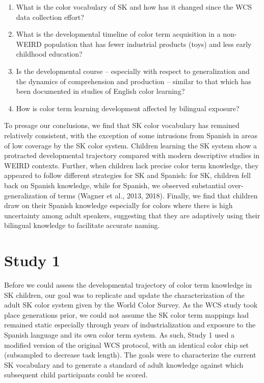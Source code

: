 \documentclass[
  english,
  ,man,floatsintext]{apa6}
\providecommand{\tightlist}{%
  \setlength{\itemsep}{0pt}\setlength{\parskip}{0pt}}
\begin{document}
\begin{enumerate}
\def\labelenumi{\arabic{enumi}.}
\tightlist
\item
  What is the color vocabulary of SK and how has it changed since the WCS data collection effort?
\item
  What is the developmental timeline of color term acquisition in a non-WEIRD population that has fewer industrial products (toys) and less early childhood education?
\item
  Is the developmental course -- especially with respect to generalization and the dynamics of comprehension and production -- similar to that which has been documented in studies of English color learning?
\item
  How is color term learning development affected by bilingual exposure?
\end{enumerate}

To presage our conclusions, we find that SK color vocabulary has remained relatively consistent, with the exception of some intrusions from Spanish in areas of low coverage by the SK color system. Children learning the SK system show a protracted developmental trajectory compared with modern descriptive studies in WEIRD contexts. Further, when children lack precise color term knowledge, they appeared to follow different strategies for SK and Spanish: for SK, children fell back on Spanish knowledge, while for Spanish, we observed substantial over-generalization of terms (Wagner et al., 2013, 2018). Finally, we find that children draw on their Spanish knowledge especially for colors where there is high uncertainty among adult speakers, suggesting that they are adaptively using their bilingual knowledge to facilitate accurate naming.

\hypertarget{study-1}{%
\section{Study 1}\label{study-1}}

Before we could assess the developmental trajectory of color term knowledge in SK children, our goal was to replicate and update the characterization of the adult SK color system given by the World Color Survey. As the WCS study took place generations prior, we could not assume the SK color term mappings had remained static especially through years of industrialization and exposure to the Spanish language and its own color term system. As such, Study 1 used a modified version of the original WCS protocol, with an identical color chip set (subsampled to decrease task length). The goals were to characterize the current SK vocabulary and to generate a standard of adult knowledge against which subsequent child participants could be scored.
\end{document}
